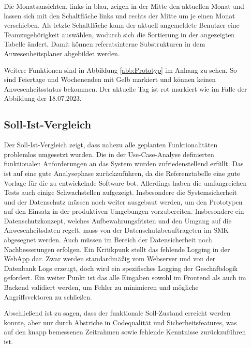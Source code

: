 Die Monatsansichten, links in blau, zeigen in der Mitte den aktuellen Monat und lassen sich mit den Schaltfläche links und rechts der Mitte um je einen Monat verschieben. Als letzte Schaltfläche kann der aktuell angemeldete Benutzer eine Teamzugehörigkeit auswählen, wodurch sich die Sortierung in der angezeigten Tabelle ändert. Damit können referatsinterne Substrukturen in dem Anwesenheitsplaner abgebildet werden.

Weitere Funktionen sind in Abbildung \ref{abb:Prototyp} im Anhang zu sehen. So sind \zB Feiertage und Wochenenden mit Gelb markiert und können keinen Anwesenheitsstatus bekommen. Der aktuelle Tag ist rot markiert wie im Falle der Abbildung der 18.07.2023.

\subsection{Soll-Ist-Vergleich}
\label{sec:Soll-Ist-Vergleich}
Der Soll-Ist-Vergleich zeigt, dass nahezu alle geplanten Funktionalitäten problemlos umgesetzt wurden. Die in der Use-Case-Analyse definierten funktionalen Anforderungen an das System wurden zufriedenstellend erfüllt. Das ist auf eine gute Analysephase zurückzuführen, da die Referenztabelle eine gute Vorlage für die zu entwickelnde Software bot. Allerdings haben die umfangreichen Tests auch einige Schwachstellen aufgezeigt. Insbesondere die Systemsicherheit und der Datenschutz müssen noch weiter ausgebaut werden, um den Prototypen auf den Einsatz in der produktiven Umgebungen vorzubereiten. Insbesondere ein Datenschutzkonzept, welches Aufbewahrungsfristen und den Umgang auf die Anwesenheitsdaten regelt, muss von der Datenschutzbeauftrageten im SMK abgesegnet werden. Auch müssen im Bereich der Datensicherheit noch Nachbesserungen erfolgen. Ein Kritikpunk stellt \zB das fehlende Logging in der WebApp dar. Zwar werden  standardmäßig vom Webserver und von der Datenbank Logs erzeugt, doch wird ein spezifisches Logging der Geschäftslogik gefordert. Ein weiter Punkt ist das alle Eingaben sowohl im Frontend als auch im Backend validiert werden, um Fehler zu minimieren und mögliche Angriffsvektoren zu schließen.

Abschließend ist zu sagen, dass der funktionale Soll-Zustand erreicht werden konnte, aber nur durch Abstriche in Codequalität und Sicherheitsfeatures, was auf den knapp bemessenen Zeitrahmen sowie fehlende Kenntnisse zurückzuführen ist.

